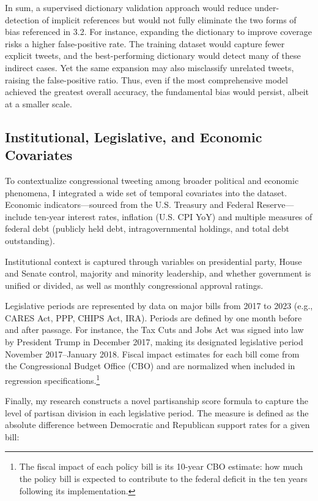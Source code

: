 \documentclass[
  12pt,
]{article}
\begin{document}
In sum, a supervised dictionary validation approach would reduce
under-detection of implicit references but would not fully eliminate the
two forms of bias referenced in 3.2. For instance, expanding the
dictionary to improve coverage risks a higher false-positive rate. The
training dataset would capture fewer explicit tweets, and the
best-performing dictionary would detect many of these indirect cases.
Yet the same expansion may also misclassify unrelated tweets, raising
the false-positive ratio. Thus, even if the most comprehensive model
achieved the greatest overall accuracy, the fundamental bias would
persist, albeit at a smaller scale.

\subsection{Institutional, Legislative, and Economic
Covariates}\label{institutional-legislative-and-economic-covariates}

To contextualize congressional tweeting among broader political and
economic phenomena, I integrated a wide set of temporal covariates into
the dataset. Economic indicators---sourced from the U.S. Treasury and
Federal Reserve---include ten-year interest rates, inflation (U.S. CPI
YoY) and multiple measures of federal debt (publicly held debt,
intragovernmental holdings, and total debt outstanding).

Institutional context is captured through variables on presidential
party, House and Senate control, majority and minority leadership, and
whether government is unified or divided, as well as monthly
congressional approval ratings.

Legislative periods are represented by data on major bills from 2017 to
2023 (e.g., CARES Act, PPP, CHIPS Act, IRA). Periods are defined by one
month before and after passage. For instance, the Tax Cuts and Jobs Act
was signed into law by President Trump in December 2017, making its
designated legislative period November 2017--January 2018. Fiscal impact
estimates for each bill come from the Congressional Budget Office (CBO)
and are normalized when included in regression
specifications.\footnote{The fiscal impact of each policy bill is its
  10-year CBO estimate: how much the policy bill is expected to
  contribute to the federal deficit in the ten years following its
  implementation.}

Finally, my research constructs a novel partisanship score formula to
capture the level of partisan division in each legislative period. The
measure is defined as the absolute difference between Democratic and
Republican support rates for a given bill:
\end{document}
